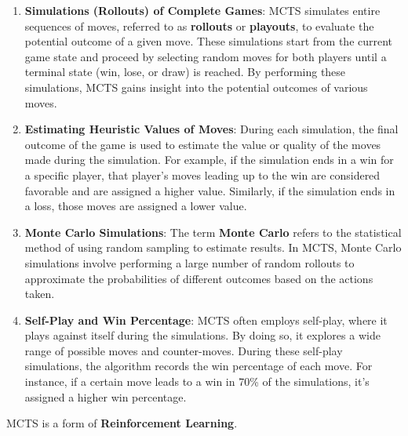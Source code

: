 \documentclass{article}
\begin{document}
\begin{enumerate}
    \item \textbf{Simulations (Rollouts) of Complete Games}:
    MCTS simulates entire sequences of moves, referred to as \textbf{rollouts} or \textbf{playouts}, to evaluate the potential outcome of a given move. These simulations start from the current game state and proceed by selecting random moves for both players until a terminal state (win, lose, or draw) is reached. By performing these simulations, MCTS gains insight into the potential outcomes of various moves.
    
    \item \textbf{Estimating Heuristic Values of Moves}:
    During each simulation, the final outcome of the game is used to estimate the value or quality of the moves made during the simulation. For example, if the simulation ends in a win for a specific player, that player's moves leading up to the win are considered favorable and are assigned a higher value. Similarly, if the simulation ends in a loss, those moves are assigned a lower value.
    
    \item \textbf{Monte Carlo Simulations}:
    The term \textbf{Monte Carlo} refers to the statistical method of using random sampling to estimate results. In MCTS, Monte Carlo simulations involve performing a large number of random rollouts to approximate the probabilities of different outcomes based on the actions taken.
    
    \item \textbf{Self-Play and Win Percentage}:
    MCTS often employs self-play, where it plays against itself during the simulations. By doing so, it explores a wide range of possible moves and counter-moves. During these self-play simulations, the algorithm records the win percentage of each move. For instance, if a certain move leads to a win in 70\% of the simulations, it's assigned a higher win percentage.
\end{enumerate}

MCTS is a form of \textbf{Reinforcement Learning}.
\end{document}
